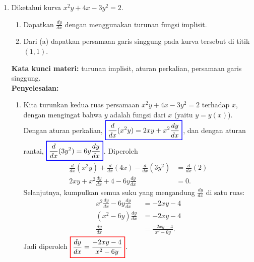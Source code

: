 \documentclass[10pt,openany,a4paper]{article}
\theoremstyle{definition}
\theoremstyle{definition}
\theoremstyle{plain}
\newenvironment{jawab}[2][tes]{%
\par\noindent\textbf{Kata kunci materi:} #1.\\
\textbf{Penyelesaian:} #2%
}{}
\begin{document}
\begin{enumerate}
\begin{jawab}[limit fungsi, faktorisasi, sketsa grafik]
{\begin{enumerate}
\begin{center}
                    \end{center}
                \end{enumerate}
            }
            \end{jawab}
            \item Diketahui kurva $x^2y+4x-3y^2=2$.
            \begin{enumerate}
                \item Dapatkan $\frac{dy}{dx}$ dengan menggunakan turunan fungsi implisit.
                \item Dari (a) dapatkan persamaan garis singgung pada kurva tersebut di titik $(1,1)$.
            \end{enumerate}
            \begin{jawab}[turunan implisit, aturan perkalian, persamaan garis singgung]{
                \begin{enumerate}
                    \item Kita turunkan kedua ruas persamaan $x^2y+4x-3y^2=2$ terhadap $x$, dengan mengingat bahwa $y$ adalah fungsi dari $x$ (yaitu $y=y(x)$). Dengan aturan perkalian, $\colorlet{oldcolor}{.}
        \color{blue}
        \setlength{\fboxrule}{1pt} \boxed{\color{oldcolor}\frac{d}{dx}(x^2y) = 2xy + x^2\frac{dy}{dx}}\color{oldcolor}$, dan dengan aturan rantai, $\colorlet{oldcolor}{.}
        \color{blue}
        \setlength{\fboxrule}{1pt} \boxed{\color{oldcolor}\frac{d}{dx}(3y^2) = 6y\frac{dy}{dx}}\color{oldcolor}$. Diperoleh
                    \begin{align*}
                        \frac{d}{dx}(x^2y) + \frac{d}{dx}(4x) - \frac{d}{dx}(3y^2) &= \frac{d}{dx}(2)\\
                        2xy + x^2\frac{dy}{dx} + 4 - 6y\frac{dy}{dx} &= 0.
                    \end{align*}
                    Selanjutnya, kumpulkan semua suku yang mengandung $\frac{dy}{dx}$ di satu ruas:
                    \begin{align*}
                        x^2\frac{dy}{dx} - 6y\frac{dy}{dx} &= -2xy - 4\\
                        (x^2 - 6y)\frac{dy}{dx} &= -2xy - 4\\
                        \frac{dy}{dx} &= \frac{-2xy - 4}{x^2 - 6y}.
                    \end{align*}
                    Jadi diperoleh $\colorlet{oldcolor}{.}
        \color{red}
        \setlength{\fboxrule}{1pt} \boxed{\color{oldcolor}\frac{dy}{dx} = \frac{-2xy - 4}{x^2 - 6y}}\color{oldcolor}$.

\end{enumerate}}
\end{jawab}
\end{enumerate}
\end{document}
